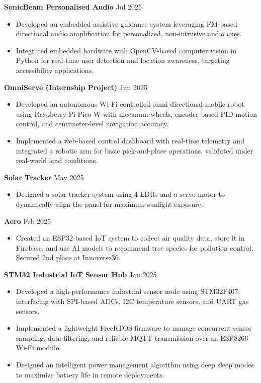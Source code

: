 \documentclass[10pt,a4paper]{article}%
\begin{document}
\noindent \textbf{SonicBeam Personalised Audio} \hfill Jul 2025%
\begin{itemize}[leftmargin=15pt, nosep, topsep=0pt]%
\item Developed an embedded assistive guidance system leveraging FM-based directional audio amplification for personalized, non-intrusive audio cues.%
\item Integrated embedded hardware with OpenCV-based computer vision in Python for real-time user detection and location awareness, targeting accessibility applications.%
\end{itemize} \vspace{8pt}%
\noindent \textbf{OmniServe (Internship Project)} \hfill Jun 2025%
\begin{itemize}[leftmargin=15pt, nosep, topsep=0pt]%
\item Developed an autonomous Wi-Fi controlled omni-directional mobile robot using Raspberry Pi Pico W with mecanum wheels, encoder-based PID motion control, and centimeter-level navigation accuracy.%
\item Implemented a web-based control dashboard with real-time telemetry and integrated a robotic arm for basic pick-and-place operations, validated under real-world load conditions.%
\end{itemize} \vspace{8pt}%
\noindent \textbf{Solar Tracker} \hfill May 2025%
\begin{itemize}[leftmargin=15pt, nosep, topsep=0pt]%
\item Designed a solar tracker system using 4 LDRs and a servo motor to dynamically align the panel for maximum sunlight exposure.%
\end{itemize} \vspace{8pt}%
\noindent \textbf{Aero} \hfill Feb 2025%
\begin{itemize}[leftmargin=15pt, nosep, topsep=0pt]%
\item Created an ESP32-based IoT system to collect air quality data, store it in Firebase, and use AI models to recommend tree species for pollution control. Secured 2nd place at Innoverse\'36.%
\end{itemize} \vspace{8pt}%
\noindent \textbf{STM32 Industrial IoT Sensor Hub} \hfill Jan 2025%
\begin{itemize}[leftmargin=15pt, nosep, topsep=0pt]%
\item Developed a high-performance industrial sensor node using STM32F407, interfacing with SPI-based ADCs, I2C temperature sensors, and UART gas sensors.%
\item Implemented a lightweight FreeRTOS firmware to manage concurrent sensor sampling, data filtering, and reliable MQTT transmission over an ESP8266 Wi-Fi module.%
\item Designed an intelligent power management algorithm using deep sleep modes to maximize battery life in remote deployments.%
\end{itemize} \vspace{8pt}%
\end{document}
